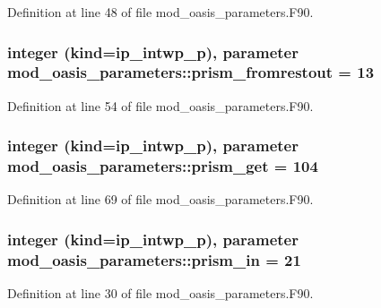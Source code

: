Definition at line 48 of file mod\+\_\+oasis\+\_\+parameters.\+F90.

\hypertarget{classmod__oasis__parameters_ac989a8af875dd1765b1369814fd4eb9d}{
\subsubsection[{prism\+\_\+fromrestout}]{\setlength{\rightskip}{0pt plus 5cm}integer (kind=ip\+\_\+intwp\+\_\+p), parameter mod\+\_\+oasis\+\_\+parameters\+::prism\+\_\+fromrestout = 13}}\label{classmod__oasis__parameters_ac989a8af875dd1765b1369814fd4eb9d}


Definition at line 54 of file mod\+\_\+oasis\+\_\+parameters.\+F90.

\hypertarget{classmod__oasis__parameters_a136a476f2771e33d12e42b47eef72f9b}{
\subsubsection[{prism\+\_\+get}]{\setlength{\rightskip}{0pt plus 5cm}integer (kind=ip\+\_\+intwp\+\_\+p), parameter mod\+\_\+oasis\+\_\+parameters\+::prism\+\_\+get = 104}}\label{classmod__oasis__parameters_a136a476f2771e33d12e42b47eef72f9b}


Definition at line 69 of file mod\+\_\+oasis\+\_\+parameters.\+F90.

\hypertarget{classmod__oasis__parameters_a9cd491b86da0ba4612f2de5a9ef52e7c}{
\subsubsection[{prism\+\_\+in}]{\setlength{\rightskip}{0pt plus 5cm}integer (kind=ip\+\_\+intwp\+\_\+p), parameter mod\+\_\+oasis\+\_\+parameters\+::prism\+\_\+in = 21}}\label{classmod__oasis__parameters_a9cd491b86da0ba4612f2de5a9ef52e7c}


Definition at line 30 of file mod\+\_\+oasis\+\_\+parameters.\+F90.

